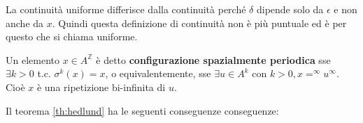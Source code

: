 \begin{nota}
    La continuità uniforme differisce dalla continuità perché $\delta$ dipende
    solo da $\epsilon$ e non anche da $x$. Quindi questa definizione di continuità non
    è più puntuale ed è per questo che si chiama uniforme.
\end{nota}

\begin{definizione}
    Un elemento $x\in A^\mathbb{Z}$ è detto \textbf{configurazione spazialmente
        periodica} sse $\exists k>0 $ t.c. $\sigma^k(x) = x$, o equivalentemente, sse
    $\exists u\in A^k$ con $k>0, x = ^\infty u ^\infty$. Cioè $x$ è una ripetizione
    bi-infinita di $u$.
\end{definizione}

Il teorema \ref{th:hedlund} ha le seguenti conseguenze conseguenze:

